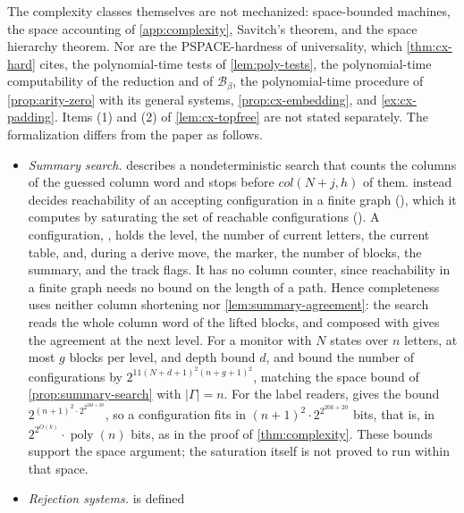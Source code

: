 The complexity classes themselves are not mechanized: space-bounded
machines, the space accounting of \cref{app:complexity}, Savitch's theorem,
and the space hierarchy theorem. Nor are the PSPACE-hardness of
universality, which \cref{thm:cx-hard} cites, the polynomial-time tests of
\cref{lem:poly-tests}, the polynomial-time computability of the reduction and
of $\mathcal B_\beta$, the polynomial-time procedure of
\cref{prop:arity-zero} with its general systems, \cref{prop:cx-embedding},
and \cref{ex:cx-padding}. Items (1) and (2) of \cref{lem:cx-topfree} are
not stated separately. The formalization differs from the paper as follows.
\begin{itemize}[leftmargin=*]
\item \emph{Summary search.}  describes a
nondeterministic search that counts the columns of the guessed column word
and stops before $\mathit{col}(N+j,h)$ of them.
 instead decides reachability of an
accepting configuration in a finite graph
(), which it computes
by saturating the set of reachable configurations
(). A configuration,
, holds the level, the number of current
letters, the current table, and, during a derive move, the marker, the
number of blocks, the summary, and the track flags. It has no column counter, since reachability in a finite
graph needs no bound on the length of a path. Hence completeness uses
neither column shortening nor \cref{lem:summary-agreement}: the search reads
the whole column word of the lifted blocks, and
 composed with
 gives the agreement at the next level. For a
monitor with $N$ states over $n$ letters, at most $g$ blocks per level, and
depth bound $d$,  and
 bound the number of configurations
by $2^{11(N+d+1)^2(n+g+1)^2}$, matching the space bound of
\cref{prop:summary-search} with $|\Gamma|=n$. For the label readers,
 gives the bound
$2^{(n+1)^2\cdot2^{2^{20k+20}}}$, so a configuration fits in
$(n+1)^2\cdot2^{2^{20k+20}}$ bits, that is, in
$2^{2^{O(k)}}\cdot\operatorname{poly}(n)$ bits, as in the proof of
\cref{thm:complexity}. These bounds support the space argument; the
saturation itself is not proved to run within that space.
\item \emph{Rejection systems.}  is defined

\end{itemize}
